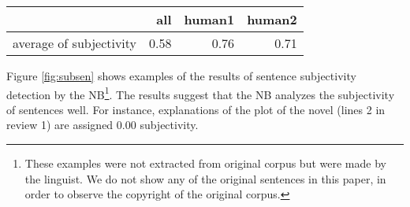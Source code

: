\documentclass[japanese]{jnlp_1.3d}
\begin{document}
\begin{table}[t]
	\label{tab:sub_human}
	  \begin{center}
      \begin{tabular}{|l|rrr|} \hline
                         &  all  & human1 &  human2 \\ \hline
 average of subjectivity & 0.58  & 0.76  & 0.71 \\ \hline
  \end{tabular}
  \end{center}
\end{table}

Figure \ref{fig:subsen} shows examples of the results of sentence subjectivity detection by the NB\footnote{These examples were not extracted from original corpus but were made by the linguist. We do not show any of the original sentences in this paper, in order to observe the copyright of the original corpus.}. The results suggest that the NB analyzes the subjectivity of sentences well. For instance, explanations of the plot of the novel (lines 2 in review 1) are assigned $0.00$ subjectivity.
\end{document}
